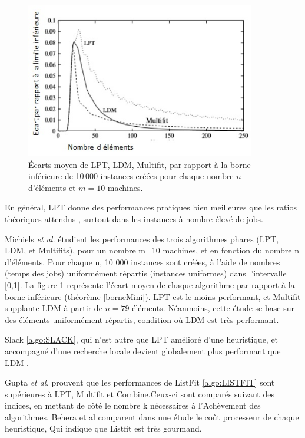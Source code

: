 \documentclass[a4paper,12pt]{report}
\theoremstyle{plain}				%
\theoremstyle{definition}				%
\begin{document}
\begin{figure}
\centering
\includegraphics[width=10cm,height=6.80cm]
{Biblio_PCmax_Rendu_CompborneInf_LPT_LDM_MULTIFIT.jpg}
\caption{Écarts moyen de LPT, LDM, Multifit, par rapport à la borne
  inférieure de 10\,000 instances créées pour chaque nombre $n$
  d'éléments et $m=10$ machines.}
\label{comparaison:LPTLDMMFBorneInf}
\end{figure}

En général, LPT donne des performances pratiques bien meilleures que
les ratios théoriques attendus \cite{della2018longest}, surtout dans
les instances à nombre élevé de jobs.

Michiels \emph{et al.}
\citep{michiels2003performance} étudient les performances des trois
algorithmes phares (LPT, LDM, et Multifits), pour un nombre m=10
machines, et en fonction du nombre n d'éléments.
Pour chaque n, 10 000 instances sont créées, à l'aide de nombres
(temps des jobs) uniformément répartis (instances uniformes) dans
l'intervalle [0,1].
La figure \ref{comparaison:LPTLDMMFBorneInf} représente l'écart moyen
de chaque algorithme par rapport à la borne inférieure (théorème
\ref{borneMini}).
LPT est le moins performant, et Multifit supplante LDM à partir de
$n=79$ éléments.
Néanmoins, cette étude se base sur des éléments uniformément répartis,
condition où LDM est très performant.

Slack \ref{algo:SLACK}, qui n'est autre que LPT amélioré d'une
heuristique, et accompagné d'une recherche locale devient globalement
plus performant que LDM \cite{della2018longest}.

Gupta \emph{et al.}
prouvent que les performances de ListFit \ref{algo:LISTFIT} sont
supérieures à LPT, Multifit et Combine.Ceux-ci sont comparés
\cite{gupta2001listfit} \cite{lee1988multiprocessor} suivant des
indices, en mettant de côté le nombre k nécessaires à l’Achèvement des
algorithmes.
Behera et al \cite{behera2012comparison} comparent dans une étude le
coût processeur de chaque heuristique, Qui indique que Listfit est
très gourmand.
\end{document}

